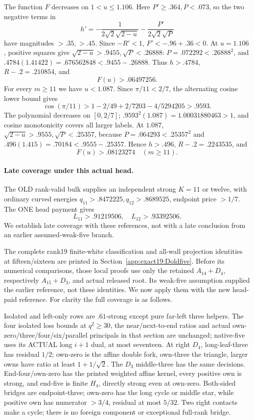 \documentclass[11pt]{article}
\theoremstyle{definition}
\theoremstyle{remark}
\begin{document}
The function \(F\) decreases on \(1<u\le1.106\).
Here \(P'\ge.364,P<.073\), so the two negative terms in
\[
 h'=-\frac1{2\sqrt2\sqrt{2-u}}-\frac{P'}{2\sqrt2\sqrt P}
\]
have magnitudes \(>.35,>.45\).
Since \(-R'<1\), \(F'<-.96+.36<0\).
At \(u=1.106\), positive squares give
\(\sqrt{2-u}>.9455,\sqrt P<.26888\):
\(P=.072292<.26888^2\), and
\(.4784(1.41422)=.676562848<.9455-.26888\).
Thus \(h>.4784\), \(R-.2=.210854\), and
\[
                                F(u)>.06497256 .
\tag{D19largecommongain}\label{app:exact19:eq:Dlargecommongain}
\]
For every \(m\ge11\) we have \(u<1.087\).
Since \(\pi/11<2/7\), the alternating cosine lower bound gives
\[
       \cos(\pi/11)>1-2/49+2/7203-4/5294205>.9593 .
\]
The polynomial decreases on \([0,2/7]\);
\(.9593^2(1.087)=1.00031880463>1\), and cosine monotonicity covers all
larger labels.
At \(1.087\), \(\sqrt{2-u}>.9555,\sqrt P<.25357\), because
\(P=.064293<.25357^2\) and
\(.496(1.415)=.70184<.9555-.25357\).
Hence \(h>.496\), \(R-.2=.2243535\), and
\[
                           F(u)>.08123274\quad(m\ge11).
\tag{D19largerfinitegain}\label{app:exact19:eq:Dlargerfinitegain}
\]

\paragraph{Late coverage under this actual head.}
The OLD rank-valid bulk supplies an independent strong \(K=11\) or
twelve, with ordinary curved energies
\(q_{11}>.8472225,q_{12}>.8689525\), endpoint price \(>1/7\).
The ONE head payment gives
\[
                         L_{11}>.91219506,\quad L_{12}>.93392506 .
\]
We establish late coverage with these references, not with a late
conclusion from an earlier assumed-weak-five branch.

The complete rank19 finite-white classification and all-wall
projection identities at fifteen/sixteen are printed in
Section~\ref{app:exact19:Doldfive}.
Before its numerical comparisons, those local proofs use only the
retained \(A_{14}+D_4\), respectively \(A_{15}+D_3\), and actual released
root. Its weak-five assumption supplied the earlier reference, not
these identities. We now apply them with the new head-paid reference.
For clarity the full coverage is as follows.

Isolated and left-only rows are \(.61\)-strong except pure far-left
three helpers. The four isolated loss bounds at \(q^2\ge30\), the
near/next-to-end ratios and actual own-zero/three/four/six/parallel
principals in that section are unchanged; native-five uses its ACTUAL
long \(i+1\) dual, at most seventeen.
At right \(D_4\), long-leaf-three has residual \(1/2\);
own-zero is the affine double fork, own-three the triangle, larger
owns have ratio at least \(1+1/\sqrt2\).
The \(D_3\) middle-three has the same decisions.
End-four/own-zero has the printed weighted affine kernel, every
positive own is strong, and end-five is finite \(H_4\), directly strong
even at own-zero.
Both-sided bridges are endpoint-three; own-zero has the long cycle or
middle star, while positive own has numerator \(>3/4\), residual
at most \(5/32\).
Two right contacts make a cycle; there is no foreign component or
exceptional full-rank bridge.
\end{document}
